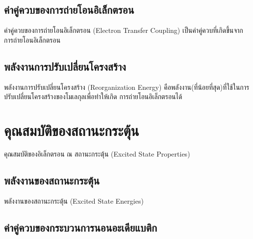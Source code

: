 \subsection{ค่าคู่ควบของการถ่ายโอนอิเล็กตรอน}
\label{ssec:et_coupling}

ค่าคู่ควบของการถ่ายโอนอิเล็กตรอน (Electron Transfer Coupling) เป็นค่าคู่ควบที่เกิดขึ้นจากการถ่ายโอนอิเล็กตรอน

\subsection{พลังงานการปรับเปลี่ยนโครงสร้าง}
\label{ssec:reor_ener}

พลังงานการปรับเปลี่ยนโครงสร้าง (Reorganization Energy) คือพลังงาน(ที่น้อยที่สุด)ที่ใช้ในการปรับเปลี่ยนโครงสร้างของโมเลกุลเพื่อทำให้เกิด%
การถ่ายโอนอิเล็กตรอนได้

\section{คุณสมบัติของสถานะกระตุ้น}
\label{sec:ex_prop}

คุณสมบัติของอิเล็กตรอน ณ สถานะกระตุ้น (Excited State Properties)

\subsection{พลังงานของสถานะกระตุ้น}
\label{ssec:ex_ener}

พลังงานของสถานะกระตุ้น (Excited State Energies)

\subsection{ค่าคู่ควบของกระบวนการนอนอะเดียแบติก}
\label{ssec:nonadia_ener}

